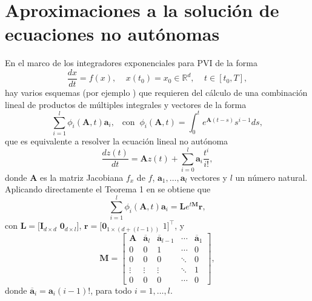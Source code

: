 \section{Aproximaciones a la solución de ecuaciones no autónomas}
En el marco de los integradores exponenciales para PVI de la forma
\begin{equation*}
	\frac{dx}{dt}=f(x),  \;\;\;\; x(t_0)=x_0 \in \mathbb{R}^{d},   \;\;\;\; t\in[t_0,T],
\end{equation*}
hay varios esquemas (por ejemplo \cite{tokman2006efficient,delaCruz07,hochbruck2011exponential}) que requieren del cálculo de una combinación lineal de productos de múltiples integrales y vectores de la forma
\begin{equation*}
	\sum\limits_{i=1}^{l}\phi _{i}(\mathbf{A},t)\mathbf{a}_{i},   \;\;\;\mathrm{con} \;\; \phi _{i}(\mathbf{A},t)=\int_{0}^{t}e^{\mathbf{A}(t-s)}s^{i-1}ds,
\end{equation*}
que es equivalente a resolver la ecuación lineal no autónoma \cite{skaflestad2009scaling}
\begin{equation}\label{ODELinNoAut}
	\frac{dz(t)}{dt} = \mathbf{A}z(t)+\sum\limits_{i=0}^{l}\mathbf{a}_i\frac{t^i}{i!},
\end{equation}
donde $\mathbf{A}$ es la matriz Jacobiana $f_x$ de $f$, $\mathbf{a}_1,\ldots,\mathbf{a}_l$ vectores y $l$ un número natural. 
Aplicando directamente el Teorema 1 en \cite{carbonell2008computing} se obtiene que \cite{carbonell2008computing,jimenez2006local}
\begin{equation}\label{sum2_phiXv}
\sum\limits_{i=1}^{l}\phi _{i}(\mathbf{A},t)\mathbf{a}_{i} = \mathbf{L} e^{t \mathbf{M}}\mathbf{r},
\end{equation}
con $\mathbf{L}=[\mathbf{I}_{d\times d}$ $\mathbf{0}_{d\times l}]$, $\mathbf{r}=[\mathbf{0}_{1\times (d+(l-1))}$ $1]^{\intercal }$, y
\begin{equation*}
\mathbf{M}=\left[
\begin{array}{ccccc}
\mathbf{A} & \overline{\mathbf{a}}_{l} & \overline{\mathbf{a}}_{l-1} & \cdots & \overline{\mathbf{a}}_{1} \\ 
0 & 0 & 1 & \cdots & 0 \\
0 & 0 & 0 & \ddots & 0 \\
\vdots & \vdots & \vdots & \ddots & 1 \\
0 & 0 & 0 & \cdots & 0
\end{array}%
\right],  \label{matrixH2}
\end{equation*}%
donde $\overline{\mathbf{a}}_{i}=\mathbf{a}_{i}(i-1)!$, para todo $i=1,\ldots ,l$.

